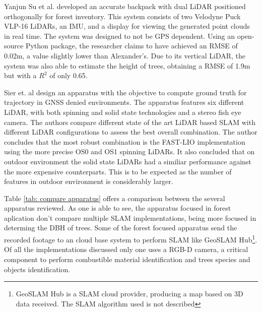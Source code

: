 Yanjun Su et al. \cite{su_development_2021} developed an accurate backpack with dual \acs*{LiDAR} positioned orthogonally for forest inventory. This system consists of two Velodyne Puck VLP-16 \acs*{LiDAR}s, an \acs*{IMU}, and a display for viewing the generated point clouds in real time. The system was designed to not be \acs*{GPS} dependent. Using an open-source Python package, the researcher claims to have achieved an \acs*{RMSE} of 0.02m, a value slightly lower than Alexander's. Due to its vertical \acs*{LiDAR}, the system was also able to estimate the height of trees, obtaining a RMSE of 1.9m but with a $R^2$ of only 0.65.

Sier et. al \cite{sier_benchmark_2022} design an apparatus with the objective to compute ground truth for trajectory in \acs*{GNSS} denied environments. The apparatus features six different \acs*{LiDAR}, with both spinning and solid state technologies and a stereo fish eye camera. The authors compare different state of the art \acs*{LiDAR} based \acs*{SLAM} with different \acs*{LiDAR} configurations to assess the best overall combination. The author concludes that the most robust combination is the FAST-LIO \cite{xu_fast-lio_2021} implementation using the more precise OS0 and OS1 spinning \acs*{LiDAR}s. It also concluded that on outdoor environment the solid state \acs*{LiDAR}s had a similiar performance against the more expensive counterparts. This is to be expected as the number of features in outdoor environment is considerably larger.
 
Table \ref*{tab: compare apparatus} offers a comparison between the several apparatus reviewed. As one is able to see, the apparatus focused in forest aplication don't compare multiple \acs*{SLAM} implementations, being more focused in determing the \acs*{DBH} of trees. Some of the forest focused apparatus send the recorded footage to an cloud base system to perform \acs*{SLAM} like GeoSLAM Hub\footnote{GeoSLAM Hub is a \acs*{SLAM} cloud provider, producing a map based on 3D data received. The \acs*{SLAM} algorithm used is not described}. Of all the implementations discussed only one uses a RGB-D camera, a critical component to perform combustible material identification and trees species and objects identification.

